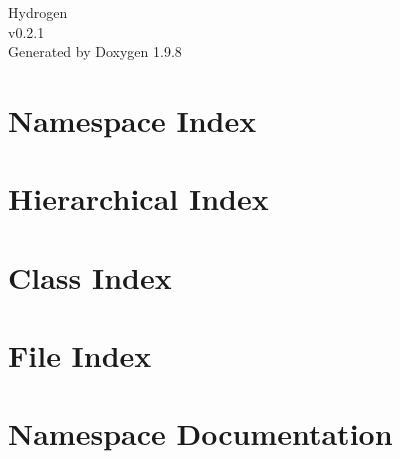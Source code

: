 \documentclass[twoside]{book}
\newcommand{\+}{\discretionary{\mbox{\scriptsize$\hookleftarrow$}}{}{}}
\newcommand{\clearemptydoublepage}{%
    \newpage{\pagestyle{empty}\cleardoublepage}%
  }
\begin{document}
  \raggedbottom
    \hypersetup{pageanchor=false,
                bookmarksnumbered=true,
                pdfencoding=unicode
               }
  \begin{titlepage}
  \vspace*{7cm}
  \begin{center}%
  {\Large Hydrogen}\\
  [1ex]\large v0.\+2.\+1 \\
  \vspace*{1cm}
  {\large Generated by Doxygen 1.9.8}\\
  \end{center}
  \end{titlepage}
  \clearemptydoublepage
  \tableofcontents
  \clearemptydoublepage
  \hypersetup{pageanchor=true}
\chapter{Namespace Index}

\chapter{Hierarchical Index}

\chapter{Class Index}

\chapter{File Index}

\chapter{Namespace Documentation}

\end{document}
